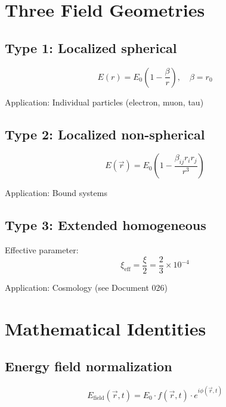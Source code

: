 	\section{Three Field Geometries}
	\label{sec:field_geometries}
	
	\subsection{Type 1: Localized spherical}
	
	\begin{equation}
		E(r) = E_0 \left(1 - \frac{\beta}{r}\right), \quad \beta = r_0
	\end{equation}
	
	Application: Individual particles (electron, muon, tau)
	
	\subsection{Type 2: Localized non-spherical}
	
	\begin{equation}
		E(\vec{r}) = E_0 \left(1 - \frac{\beta_{ij} r_i r_j}{r^3}\right)
	\end{equation}
	
	Application: Bound systems
	
	\subsection{Type 3: Extended homogeneous}
	
	Effective parameter:
	\begin{equation}
		\xi_{\text{eff}} = \frac{\xi}{2} = \frac{2}{3} \times 10^{-4}
	\end{equation}
	
	Application: Cosmology (see Document 026)
	
	\section{Mathematical Identities}
	\label{sec:identities}
	
	\subsection{Energy field normalization}
	
	\begin{equation}
		E_{\text{field}}(\vec{r}, t) = E_0 \cdot f(\vec{r}, t) \cdot e^{i\phi(\vec{r}, t)}
	\end{equation}

